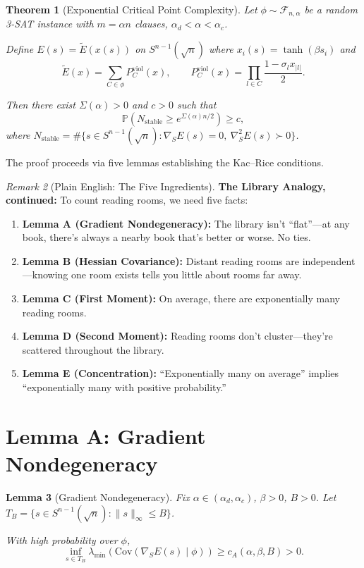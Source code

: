 \documentclass[11pt,a4paper]{article}
\theoremstyle{plain}
\newtheorem{theorem}{Theorem}
\newtheorem{lemma}[theorem]{Lemma}
\theoremstyle{definition}
\theoremstyle{remark}
\newtheorem{remark}[theorem]{Remark}
\newcommand{\Prob}{\mathbb{P}}
\newcommand{\Cov}{\mathrm{Cov}}
\begin{document}
\begin{theorem}[Exponential Critical Point Complexity]
\label{thm:kac-rice-main}
Let $\phi \sim \mathcal{F}_{n,\alpha}$ be a random 3-SAT instance with $m = \alpha n$ clauses, $\alpha_d < \alpha < \alpha_c$.

Define $E(s) = \widetilde{E}(x(s))$ on $S^{n-1}(\sqrt{n})$ where $x_i(s) = \tanh(\beta s_i)$ and
\[
\widetilde{E}(x) = \sum_{C \in \phi} P_C^{\mathrm{viol}}(x), \qquad P_C^{\mathrm{viol}}(x) = \prod_{l \in C} \frac{1 - \sigma_l x_{|l|}}{2}.
\]

Then there exist $\Sigma(\alpha) > 0$ and $c > 0$ such that
\[
\Prob\left(N_{\mathrm{stable}} \geq e^{\Sigma(\alpha)n/2}\right) \geq c,
\]
where $N_{\mathrm{stable}} = \#\{s \in S^{n-1}(\sqrt{n}) : \nabla_S E(s) = 0,\ \nabla_S^2 E(s) \succ 0\}$.
\end{theorem}

The proof proceeds via five lemmas establishing the Kac--Rice conditions.

\begin{remark}[Plain English: The Five Ingredients]
\textbf{The Library Analogy, continued:} To count reading rooms, we need five facts:
\begin{enumerate}
    \item \textbf{Lemma A (Gradient Nondegeneracy):} The library isn't ``flat''---at any book, there's always a nearby book that's better or worse. No ties.
    \item \textbf{Lemma B (Hessian Covariance):} Distant reading rooms are independent---knowing one room exists tells you little about rooms far away.
    \item \textbf{Lemma C (First Moment):} On average, there are exponentially many reading rooms.
    \item \textbf{Lemma D (Second Moment):} Reading rooms don't cluster---they're scattered throughout the library.
    \item \textbf{Lemma E (Concentration):} ``Exponentially many on average'' implies ``exponentially many with positive probability.''
\end{enumerate}
\end{remark}

\section{Lemma A: Gradient Nondegeneracy}

\begin{lemma}[Gradient Nondegeneracy]
\label{lem:gradient-nondegen}
Fix $\alpha \in (\alpha_d, \alpha_c)$, $\beta > 0$, $B > 0$. Let $T_B = \{s \in S^{n-1}(\sqrt{n}) : \|s\|_\infty \leq B\}$.

With high probability over $\phi$,
\[
\inf_{s \in T_B} \lambda_{\min}\left(\Cov(\nabla_S E(s) \mid \phi)\right) \geq c_A(\alpha, \beta, B) > 0.
\]
\end{lemma}
\end{document}
